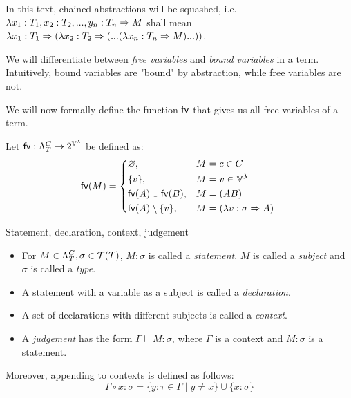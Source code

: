 \documentclass[main.tex]{subfiles}
\begin{document}
\begin{convention}
    In this text, chained abstractions will be squashed, i.e.
    $\lambda x_1 : T_1, x_2: T_2, ..., y_n: T_n \Rightarrow M$ shall mean
    $\lambda x_1 : T_1 \Rightarrow (\lambda x_2: T_2 \Rightarrow (... (\lambda x_n: T_n \Rightarrow M) ...))$.
\end{convention}

We will differentiate between \emph{free variables} and \emph{bound variables}
in a term. Intuitively, bound variables are "bound" by abstraction, while
free variables are not.

We will now formally define the function $\mathsf{fv}$ that gives us all free variables of a
term.
\begin{defn}
    Let $\mathsf{fv} : \Lambda_T^C \rightarrow 2^{\mathbb{V}^{\lambda}}$ be defined as:
    \[
        \fv{M} =
        \begin{cases*}
            \varnothing ,& $M = c \in C$ \\
            \{ v \} ,& $M = v \in \lvars$ \\
            \fv{A} \cup \fv{B} ,& $M = (AB)$ \\
            \fv{A} \setminus \{ v \} ,& $M = (\lambda v : \sigma \abstr A)$ \\
        \end{cases*}
    \]
\end{defn}

\begin{defn}
    \label{def:context}
    Statement, declaration, context, judgement \cite[chap.~2.4]{ttfp}
    \begin{itemize}
        \item For $M \in \Lambda_T^C, \sigma \in \mathcal{T}( T )$, $M : \sigma$ is called
            a \emph{statement}. $M$ is called a \emph{subject} and $\sigma$
            is called a \emph{type}.
        \item A statement with a variable as a subject is called a \emph{declaration}.
        \item A set of declarations with different subjects is called a \emph{context}.
        \item A \emph{judgement} has the form $\Gamma \vdash M: \sigma$, where
            $\Gamma$ is a context and $M: \sigma$ is a statement.
    \end{itemize}

    Moreover, appending to contexts is defined as follows:
    \[ \Gamma \circ x : \sigma = \{ y : \tau \in \Gamma \mid y \neq x \}
       \cup \{ x : \sigma \} \]
\end{defn}
\end{document}
